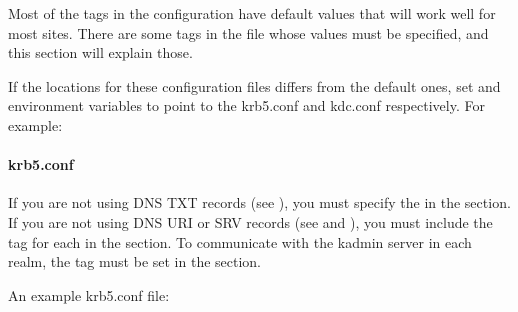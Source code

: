 \documentclass[letterpaper,10pt,english]{sphinxmanual}
\begin{document}
Most of the tags in the configuration have default values that will
work well for most sites.  There are some tags in the
{\hyperref[\detokenize{admin/conf_files/krb5_conf:krb5-conf-5}]{}} file whose values must be specified, and this
section will explain those.

If the locations for these configuration files differs from the
default ones, set  and  environment
variables to point to the krb5.conf and kdc.conf respectively.  For
example:

%
\begin{sphinxVerbatim}[commandchars=\\\{\}]
 
 
\end{sphinxVerbatim}


\paragraph{krb5.conf}
\label{\detokenize{admin/install_kdc:krb5-conf}}
If you are not using DNS TXT records (see {\hyperref[\detokenize{admin/realm_config:mapping-hostnames}]{}}),
you must specify the  in the {\hyperref[\detokenize{admin/conf_files/krb5_conf:libdefaults}]{}}
section.  If you are not using DNS URI or SRV records (see
{\hyperref[\detokenize{admin/realm_config:kdc-hostnames}]{}} and {\hyperref[\detokenize{admin/realm_config:kdc-discovery}]{}}), you must include the
 tag for each  in the {\hyperref[\detokenize{admin/conf_files/krb5_conf:realms}]{}} section.  To
communicate with the kadmin server in each realm, the 
tag must be set in the
{\hyperref[\detokenize{admin/conf_files/krb5_conf:realms}]{}} section.

An example krb5.conf file:
\end{document}
